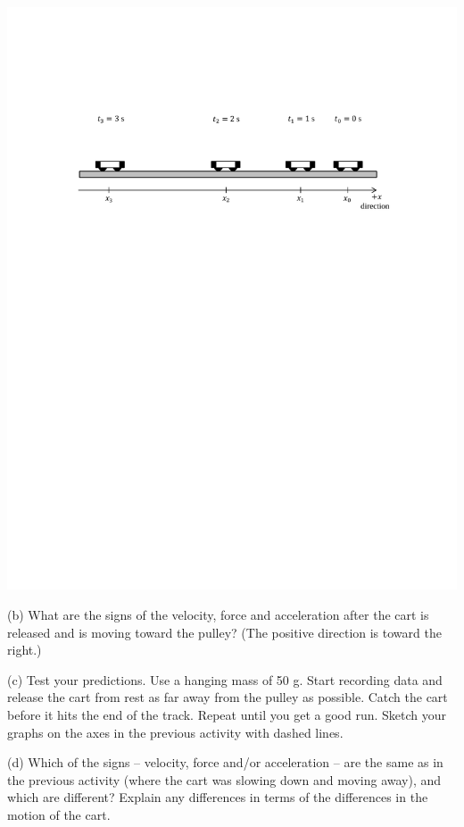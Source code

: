 \vspace{0.3cm}
{\par\centering \includegraphics{force2/carts_speeding.pdf} \par}
\vspace{0.3cm}

(b) What are the signs of the velocity, force and acceleration after the cart
is released and is moving toward the pulley? (The positive direction
is toward the right.)
\answerspace{20mm}
\pagebreak[3]

(c) Test your predictions. Use a hanging mass of 50 g. Start recording data and release the cart from rest as far away from the pulley as possible. Catch the cart before it hits the end of the track. Repeat until you get a good run. Sketch your graphs on the axes in the previous activity with dashed lines.

(d) Which of the signs -- velocity, force and/or acceleration -- are the same as
in the previous activity (where the cart was slowing down and moving away), and
which are different? Explain any differences in terms of the differences in
the motion of the cart.
\answerspace{25mm}

